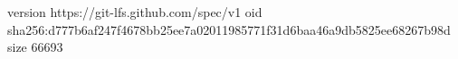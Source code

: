 version https://git-lfs.github.com/spec/v1
oid sha256:d777b6af247f4678bb25ee7a02011985771f31d6baa46a9db5825ee68267b98d
size 66693
